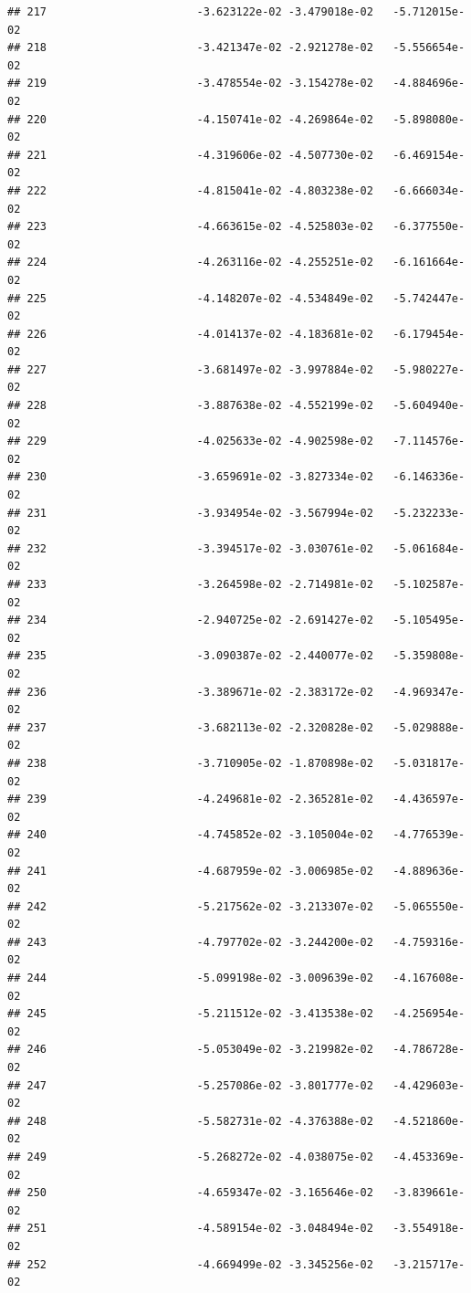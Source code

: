 \documentclass[
]{article}
\begin{document}
\begin{verbatim}
## 217                       -3.623122e-02 -3.479018e-02   -5.712015e-02
## 218                       -3.421347e-02 -2.921278e-02   -5.556654e-02
## 219                       -3.478554e-02 -3.154278e-02   -4.884696e-02
## 220                       -4.150741e-02 -4.269864e-02   -5.898080e-02
## 221                       -4.319606e-02 -4.507730e-02   -6.469154e-02
## 222                       -4.815041e-02 -4.803238e-02   -6.666034e-02
## 223                       -4.663615e-02 -4.525803e-02   -6.377550e-02
## 224                       -4.263116e-02 -4.255251e-02   -6.161664e-02
## 225                       -4.148207e-02 -4.534849e-02   -5.742447e-02
## 226                       -4.014137e-02 -4.183681e-02   -6.179454e-02
## 227                       -3.681497e-02 -3.997884e-02   -5.980227e-02
## 228                       -3.887638e-02 -4.552199e-02   -5.604940e-02
## 229                       -4.025633e-02 -4.902598e-02   -7.114576e-02
## 230                       -3.659691e-02 -3.827334e-02   -6.146336e-02
## 231                       -3.934954e-02 -3.567994e-02   -5.232233e-02
## 232                       -3.394517e-02 -3.030761e-02   -5.061684e-02
## 233                       -3.264598e-02 -2.714981e-02   -5.102587e-02
## 234                       -2.940725e-02 -2.691427e-02   -5.105495e-02
## 235                       -3.090387e-02 -2.440077e-02   -5.359808e-02
## 236                       -3.389671e-02 -2.383172e-02   -4.969347e-02
## 237                       -3.682113e-02 -2.320828e-02   -5.029888e-02
## 238                       -3.710905e-02 -1.870898e-02   -5.031817e-02
## 239                       -4.249681e-02 -2.365281e-02   -4.436597e-02
## 240                       -4.745852e-02 -3.105004e-02   -4.776539e-02
## 241                       -4.687959e-02 -3.006985e-02   -4.889636e-02
## 242                       -5.217562e-02 -3.213307e-02   -5.065550e-02
## 243                       -4.797702e-02 -3.244200e-02   -4.759316e-02
## 244                       -5.099198e-02 -3.009639e-02   -4.167608e-02
## 245                       -5.211512e-02 -3.413538e-02   -4.256954e-02
## 246                       -5.053049e-02 -3.219982e-02   -4.786728e-02
## 247                       -5.257086e-02 -3.801777e-02   -4.429603e-02
## 248                       -5.582731e-02 -4.376388e-02   -4.521860e-02
## 249                       -5.268272e-02 -4.038075e-02   -4.453369e-02
## 250                       -4.659347e-02 -3.165646e-02   -3.839661e-02
## 251                       -4.589154e-02 -3.048494e-02   -3.554918e-02
## 252                       -4.669499e-02 -3.345256e-02   -3.215717e-02

\end{verbatim}
\end{document}
